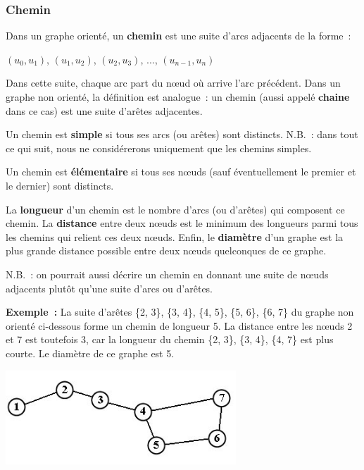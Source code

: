 		\subsubsection{Chemin}
		
			Dans un graphe orienté, un \textbf{chemin} est une 
			suite d'arcs adjacents de la forme~:

			\begin{center}
			$(u_0, u_1)$, $(u_1, u_2)$, $(u_2, u_3)$, ..., $(u_{n-1}, u_n)$
			\end{center}

			Dans cette suite, chaque arc part du n{\oe}ud où arrive 
			l'arc précédent. Dans un graphe non orienté, la définition est
			analogue~: un chemin (aussi appelé \textbf{chaine} dans ce cas) 
			est une suite d'arêtes adjacentes. 

			Un chemin est \textbf{simple} si tous ses arcs (ou arêtes) sont distincts. 
			N.B.~: dans tout ce qui suit, nous ne considérerons uniquement 
			que les chemins simples.

			Un chemin est \textbf{élémentaire} si tous ses n{\oe}uds 
			(sauf éventuellement le premier et le dernier) sont distincts.


			La \textbf{longueur} d'un chemin est le nombre d'arcs (ou d'arêtes) 
			qui composent ce chemin. La \textbf{distance} entre deux n{\oe}uds 
			est le minimum des longueurs parmi tous les chemins qui relient 
			ces deux n{\oe}uds. Enfin, le \textbf{diamètre} d'un graphe est la 
			plus grande distance possible entre deux n{\oe}uds quelconques 
			de ce graphe.

			N.B.~: on pourrait aussi décrire un chemin en donnant une suite de 
			n{\oe}uds adjacents plutôt qu'une suite d'arcs ou d'arêtes.

			\textbf{Exemple~:} 
			La suite d'arêtes \{2, 3\}, \{3, 4\}, \{4, 5\}, \{5, 6\}, \{6, 7\} 
			du graphe non orienté ci-dessous forme un chemin de longueur 5. 
			La distance entre les n{\oe}uds 2 et 7 est toutefois 3, 
			car la longueur du chemin \{2, 3\}, \{3, 4\}, \{4, 7\} est plus courte. 
			Le diamètre de ce graphe est 5.

			\begin{center}
			\includegraphics[width=8.641cm,height=3.542cm]{image/a2012Logique2eme-img047.jpg}
			\end{center}
			
